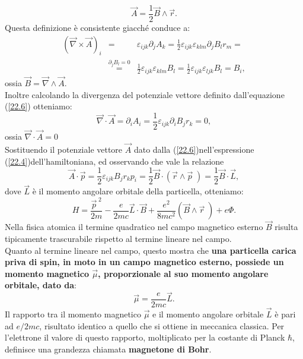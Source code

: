 \begin{equation}
\vec{A}=\frac{1}{2}\vec{B}\wedge\vec{r} .
\label{22.6}
\end{equation}
Questa definizione è consistente giacché conduce a:
\begin{eqnarray}
(\vec{\nabla}\times\vec{A})_{i}&=&\varepsilon_{ijk}\partial_{j}A_{k}=\frac{1}{2}\varepsilon_{ijk}\varepsilon_{klm}\partial_{j}B_{l}r_{m}= \nonumber \\
&\overset{\partial_{j}B_{l}=0}{=}&  \frac{1}{2}\varepsilon_{ijk}\varepsilon_{klm}B_{l}=\frac{1}{2}\varepsilon_{ijk}\varepsilon_{ljk}B_{l}=B_{i} ,
\end{eqnarray}
ossia $\vec{B}=\vec{\nabla}\wedge\vec{A}$.\\
Inoltre calcolando la divergenza del potenziale vettore definito dall'equazione (\ref{22.6}) otteniamo:
\begin{equation}
\vec{\nabla}\cdot\vec{A}=\partial_{i}A_{i}=\frac{1}{2}\varepsilon_{ijk}\partial_{i}B_{j}r_{k}=0 ,
\end{equation}
ossia $\vec{\nabla}\cdot\vec{A}=0$\\
Sostituendo il potenziale vettore $\vec{A}$ dato dalla (\ref{22.6})nell'espressione (\ref{22.4})dell'hamiltoniana, ed osservando che vale la relazione
\begin{equation}
\vec{A}\cdot\vec{p}=\frac{1}{2}\varepsilon_{ijk}B_{j}r_{k}p_{i}=\frac{1}{2}\vec{B}\cdot(\vec{r}\wedge\vec{p}\;)=\frac{1}{2}\vec{B}\cdot\vec{L} ,
\end{equation}
dove $\vec{L}$ è il momento angolare orbitale della particella, otteniamo:
\begin{equation}
H=\frac{\vec{p}^{\;2}}{2m}-\frac{e}{2mc}\vec{L}\cdot\vec{B}+\frac{e^{2}}{8mc^{2}}(\vec{B}\wedge\vec{r}\;)+e\Phi .
\label{22.10}
\end{equation}
Nella fisica atomica il termine quadratico nel campo magnetico esterno $\vec{B}$ risulta tipicamente trascurabile rispetto al termine lineare nel campo.\\
Quanto al termine lineare nel campo, questo mostra che \textbf{una particella carica priva di spin, in moto in un campo magnetico esterno, possiede un momento magnetico $\vec{\mu}$, proporzionale al suo momento angolare orbitale, dato da}:
\begin{equation}
\vec{\mu}=\frac{e}{2mc}\vec{L} .
\label{22.11}
\end{equation} 
Il rapporto tra il momento magnetico $\vec{\mu}$ e il momento angolare orbitale $\vec{L}$ è pari ad $e/2mc$, risultato identico a quello che si ottiene in meccanica classica. Per l'elettrone il valore di questo rapporto, moltiplicato per la costante di Planck $\hbar$, definisce una grandezza chiamata \textbf{magnetone di Bohr}.
